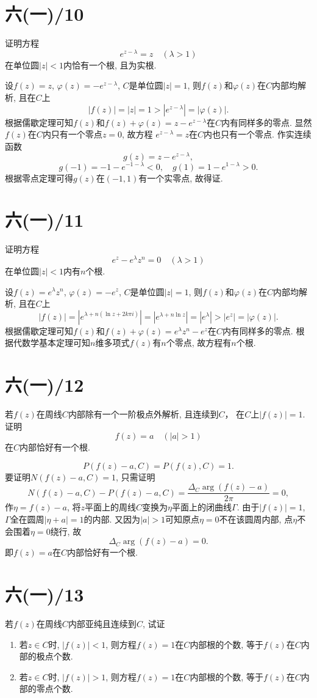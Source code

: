 \documentclass[11pt,a4paper]{article}
\begin{document}
\section{六(一)/10}
\begin{problem}
证明方程
$$e^{z-\lambda}=z\quad(\lambda>1)$$
在单位圆$|z|<1$内恰有一个根, 且为实根.
\end{problem}
设$f(z)=z$, $\varphi(z)=-e^{z-\lambda}$, $C$是单位圆$|z|=1$, 则$f(z)$和$\varphi(z)$在$C$内部均解析, 且在$C$上
$$|f(z)|=|z|=1>|e^{z-\lambda}|=|\varphi(z)|.$$
根据儒歇定理可知$f(z)$和$f(z)+\varphi(z)=z-e^{z-\lambda}$在$C$内有同样多的零点. 显然$f(z)$在$C$内只有一个零点$z=0$, 故方程
$e^{z-\lambda}=z$在$C$内也只有一个零点. 作实连续函数
$$g(z)=z-e^{z-\lambda},$$
$$g(-1)=-1-e^{-1-\lambda}<0,\quad g(1)=1-e^{1-\lambda}>0.$$
根据零点定理可得$g(z)$在$(-1,1)$有一个实零点, 故得证.

\section{六(一)/11}
\begin{problem}
证明方程
$$e^z-e^\lambda z^n=0\quad(\lambda>1)$$
在单位圆$|z|<1$内有$n$个根.
\end{problem}
设$f(z)=e^\lambda z^n$, $\varphi(z)=-e^z$, $C$是单位圆$|z|=1$, 则$f(z)$和$\varphi(z)$在$C$内部均解析, 且在$C$上
$$|f(z)|=\left|e^{\lambda+n(\ln z+2k\pi i)}\right|=|e^{\lambda+n\ln z}|=|e^\lambda|>|e^z|=|\varphi(z)|.$$
根据儒歇定理可知$f(z)$和$f(z)+\varphi(z)=e^\lambda z^n-e^z$在$C$内有同样多的零点. 根据代数学基本定理可知$n$维多项式$f(z)$有$n$个零点, 故方程有$n$个根.

\section{六(一)/12}
\begin{problem}
若$f(z)$在周线$C$内部除有一个一阶极点外解析, 且连续到$C$， 在$C$上$|f(z)|=1$. 证明
$$f(z)=a\quad(|a|>1)$$
在$C$内部恰好有一个根.
\end{problem}
$$P(f(z)-a,C)=P(f(z),C)=1.$$
要证明$N(f(z)-a,C)=1$, 只需证明
$$N(f(z)-a,C)-P(f(z)-a,C)=\frac{\Delta_C\arg(f(z)-a)}{2\pi}=0,$$
作$\eta=f(z)-a$, 将$z$平面上的周线$C$变换为$\eta$平面上的闭曲线$\Gamma$. 由于$|f(z)|=1$, $\Gamma$全在圆周$|\eta+a|=1$的内部. 又因为$|a|>1$可知原点$\eta=0$不在该圆周内部, 点$\eta$不会围着$\eta=0$绕行, 故
$$\Delta_C\arg(f(z)-a)=0.$$
即$f(z)=a$在$C$内部恰好有一个根.

\section{六(一)/13}
若$f(z)$在周线$C$内部亚纯且连续到$C$, 试证
\begin{enumerate}
  \item 若$z\in C$时, $|f(z)|<1$, 则方程$f(z)=1$在$C$内部根的个数, 等于$f(z)$在$C$内部的极点个数.
  \item 若$z\in C$时, $|f(z)|>1$, 则方程$f(z)=1$在$C$内部根的个数, 等于$f(z)$在$C$内部的零点个数.
\end{enumerate}
\end{document}
